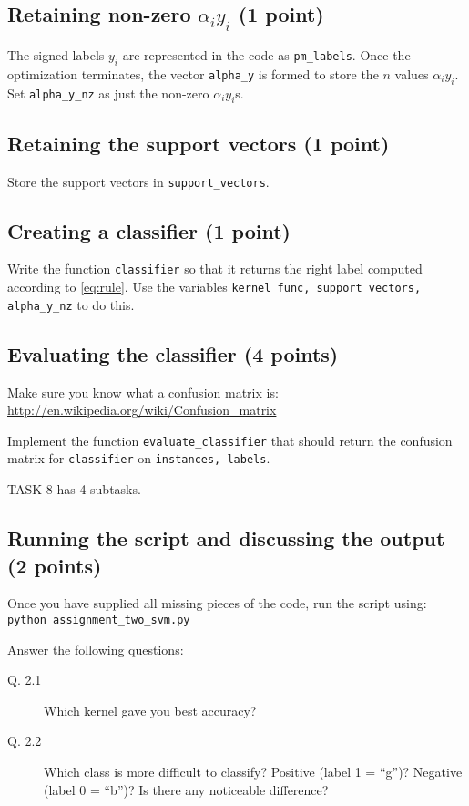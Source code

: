 \documentclass{article}
\begin{document}
\subsection{Retaining non-zero $\alpha_i y_i$ (1 point)}

The signed labels $y_i$ are represented in the code as {\tt pm\_labels}. Once the optimization terminates, the vector {\tt alpha\_y} is formed
to store the $n$ values $\alpha_i y_i$. Set {\tt alpha\_y\_nz} as just the non-zero $\alpha_i y_i$s.

\subsection{Retaining the support vectors (1 point)}

Store the support vectors in {\tt support\_vectors}.

\subsection{Creating a classifier (1 point)}

Write the function {\tt classifier} so that it returns the right label computed according to \eqref{eq:rule}. Use the variables
{\tt kernel\_func, support\_vectors, alpha\_y\_nz} to do this.

\subsection{Evaluating the classifier (4 points)}

Make sure you know what a confusion matrix is:
\url{http://en.wikipedia.org/wiki/Confusion\_matrix}

Implement the function {\tt evaluate\_classifier} that should return the confusion matrix for {\tt classifier} on {\tt instances, labels}.

TASK 8 has 4 subtasks.

\subsection{Running the script and discussing the output (2 points)}

Once you have supplied all missing pieces of the code, run the script using:\\
{\tt python assignment\_two\_svm.py}

Answer the following questions:
\begin{description}
\item[Q. 2.1]
Which kernel gave you best accuracy?
\item[Q. 2.2]
Which class is more difficult to classify? Positive (label 1 = ``g'')? Negative (label 0 = ``b'')? Is there any noticeable difference?
\end{description}
\end{document}
